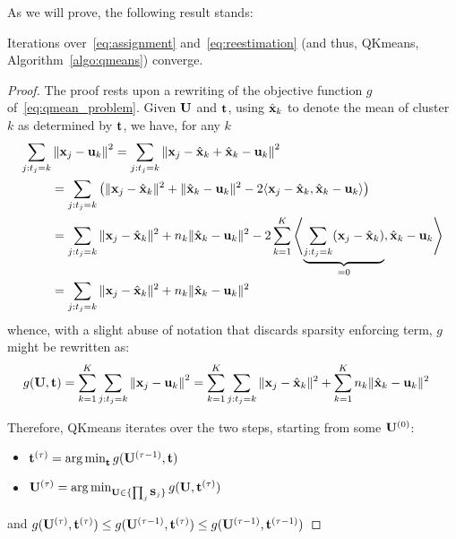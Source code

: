 

As we will prove, the following result stands:
\begin{proposition}
Iterations over~\eqref{eq:assignment} and~\eqref{eq:reestimation} (and thus, QKmeans, Algorithm~\ref{algo:qmeans}) converge. 
\end{proposition}
\begin{proof}
	The proof rests upon a rewriting of the objective function $g$ of~\eqref{eq:qmean_problem}. Given ${\mathbf{U}}$ and ${\mathbf{t}}$, using $\hat{{\mathbf{x}}}_k$ to denote
	the mean of cluster $k$ as determined by ${\mathbf{t}}$, we have, for any $k$
\begin{align*}
	\sum_{j: t_j = k} &\left\|{\mathbf{x}}_j -{\mathbf{u}}_k\right\|^2
	=\sum_{j: t_j = k} \left\|{\mathbf{x}}_j -\hat{{\mathbf{x}}}_k+\hat{{\mathbf{x}}}_k-{\mathbf{u}}_k\right\|^2\\
	& = \sum_{j: t_j = k}\left(\|{\mathbf{x}}_j-\hat{{\mathbf{x}}}_k\|^2+\|\hat{{\mathbf{x}}}_k-{\mathbf{u}}_k\|^2-2\langle{\mathbf{x}}_j-\hat{{\mathbf{x}}}_k,\hat{{\mathbf{x}}}_k-{\mathbf{u}}_k\rangle\right)\notag\\
	& = \sum_{j: t_j = k}\|{\mathbf{x}}_j-\hat{{\mathbf{x}}}_k\|^2+n_k\|\hat{{\mathbf{x}}}_k-{\mathbf{u}}_k\|^2- 2\sum_{k=1}^{K}\left\langle\underbrace{\sum_{j: t_j = k}({\mathbf{x}}_j-\hat{{\mathbf{x}}}_k)}_{=0},\hat{{\mathbf{x}}}_k-{\mathbf{u}}_k\right\rangle\notag\\
	&= \sum_{j: t_j = k}\|{\mathbf{x}}_j-\hat{{\mathbf{x}}}_k\|^2 + n_k\|\hat{{\mathbf{x}}}_k-{\mathbf{u}}_k\|^2
\end{align*}
whence, with a slight abuse of notation that discards
sparsity enforcing term, $g$ might be rewritten as:
\begin{align}
	g({\mathbf{U}},{\mathbf{t}})&=\sum_{k=1}^K\sum_{j: t_j = k}\left\|{\mathbf{x}}_j -{\mathbf{u}}_k\right\|^2=\sum_{k=1}^K\sum_{j: t_j = k}\|{\mathbf{x}}_j-\hat{{\mathbf{x}}}_k\|^2 + \sum_{k=1}^Kn_k\|\hat{{\mathbf{x}}}_k-{\mathbf{u}}_k\|^2
\end{align}

Therefore, QKmeans iterates over the two steps, starting from some ${\mathbf{U}}^{(0)}$:
\begin{itemize}
	\item ${\mathbf{t}}^{(\tau)} = \operatorname*{arg\,min}_{\mathbf{t}} g({\mathbf{U}}^{(\tau-1)},{\mathbf{t}})$
	\item ${\mathbf{U}}^{(\tau)}=\operatorname*{arg\,min}_{{\mathbf{U}}\in\{\prod_j{\mathbf{S}}_j\}}g({\mathbf{U}},{\mathbf{t}}^{(\tau)})$
\end{itemize}
and $g({\mathbf{U}}^{(\tau)},{\mathbf{t}}^{(\tau)})\leq g({\mathbf{U}}^{(\tau-1)},{\mathbf{t}}^{(\tau)})\leq g({\mathbf{U}}^{(\tau-1)},{\mathbf{t}}^{(\tau-1)})$
\end{proof}

